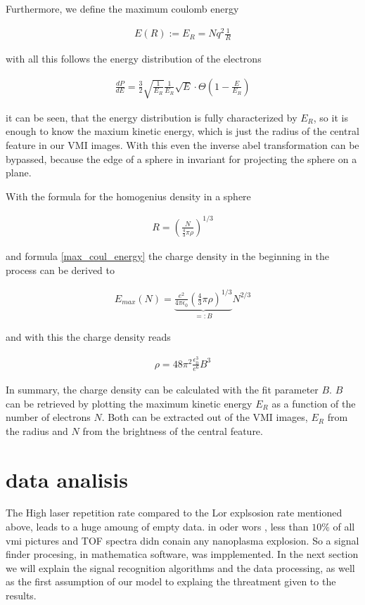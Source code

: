 Furthermore, we define the maximum coulomb energy

\begin{align}
E(R):=E_R=Nq^2 \frac{1}{R}
\label{max_coul_energy}
\end{align}

with all this follows the energy distribution of the electrons

\begin{align}
\frac{dP}{dE}=\frac{3}{2} \sqrt{\frac{1}{E_R}} \frac{1}{E_R}\sqrt{E} \cdot \Theta (1-\frac{E}{E_R})
\end{align}

it can be seen, that the energy distribution is fully characterized by $E_R$, so it is enough to know the maxium kinetic energy, which is just the radius of the central feature in our VMI images. With this even the inverse abel transformation can be bypassed, because the edge of a sphere in invariant for projecting the sphere on a plane.

With the formula for the homogenius density in a sphere

\begin{align}
R=(\frac{N}{\frac{4}{3} \pi \rho})^{1/3}
\end{align}

and formula \ref{max_coul_energy} the charge density in the beginning in the process can be derived to

\begin{align}
E_{max}(N)=\underbrace{\frac{e^2}{4 \pi \epsilon_0} (\frac{4}{3} \pi \rho)^{1/3}}_{=:B} N^{2/3}
\end{align}

and with this the charge density reads

\begin{align}
\rho=48 \pi^2 \frac{\epsilon_0^3}{e^6} B^3
\end{align}

In summary, the charge density can be calculated with the fit parameter $B$. $B$ can be retrieved by plotting the maximum kinetic energy $E_R$ as a function of the number of electrons $N$. Both can be extracted out of the VMI images, $E_R$ from the radius and $N$ from the brightness of the central feature.


\section{data analisis}
The High laser repetition rate compared to the Lor explsosion rate mentioned above, leads to a huge amoung of empty data. in oder wors , less than $10\%$ of all vmi pictures and TOF spectra didn conain any nanoplasma explosion. So a signal finder procesing, in mathematica software, was impplemented. In the next section we will explain the signal recognition algorithms and the data processing, as well as the first assumption of our model to explaing the threatment given to the results. 
